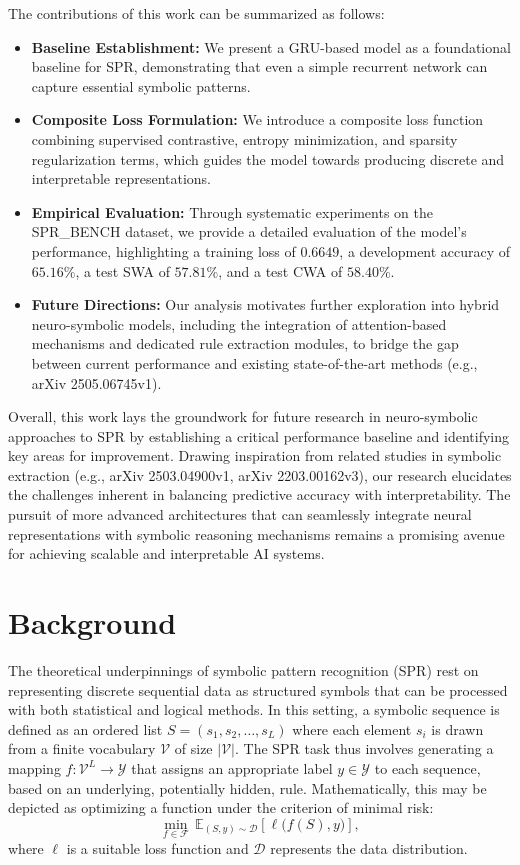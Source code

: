 \documentclass[12pt]{article}
\begin{document}
The contributions of this work can be summarized as follows:
\begin{itemize}
    \item \textbf{Baseline Establishment:} We present a GRU-based model as a foundational baseline for SPR, demonstrating that even a simple recurrent network can capture essential symbolic patterns.
    \item \textbf{Composite Loss Formulation:} We introduce a composite loss function combining supervised contrastive, entropy minimization, and sparsity regularization terms, which guides the model towards producing discrete and interpretable representations.
    \item \textbf{Empirical Evaluation:} Through systematic experiments on the SPR\_BENCH dataset, we provide a detailed evaluation of the model's performance, highlighting a training loss of \(0.6649\), a development accuracy of \(65.16\%\), a test SWA of \(57.81\%\),  and a test CWA of \(58.40\%\).
    \item \textbf{Future Directions:} Our analysis motivates further exploration into hybrid neuro-symbolic models, including the integration of attention-based mechanisms and dedicated rule extraction modules, to bridge the gap between current performance and existing state-of-the-art methods (e.g., arXiv 2505.06745v1).
\end{itemize}

Overall, this work lays the groundwork for future research in neuro-symbolic approaches to SPR by establishing a critical performance baseline and identifying key areas for improvement. Drawing inspiration from related studies in symbolic extraction (e.g., arXiv 2503.04900v1, arXiv 2203.00162v3), our research elucidates the challenges inherent in balancing predictive accuracy with interpretability. The pursuit of more advanced architectures that can seamlessly integrate neural representations with symbolic reasoning mechanisms remains a promising avenue for achieving scalable and interpretable AI systems.

\section{Background}
The theoretical underpinnings of symbolic pattern recognition (SPR) rest on representing discrete sequential data as structured symbols that can be processed with both statistical and logical methods. In this setting, a symbolic sequence is defined as an ordered list \( S = (s_1, s_2, \dots, s_L) \) where each element \( s_i \) is drawn from a finite vocabulary \( \mathcal{V} \) of size \( |\mathcal{V}| \). The SPR task thus involves generating a mapping \( f: \mathcal{V}^L \rightarrow \mathcal{Y} \) that assigns an appropriate label \( y \in \mathcal{Y} \) to each sequence, based on an underlying, potentially hidden, rule. Mathematically, this may be depicted as optimizing a function under the criterion of minimal risk:
\[
\min_{f \in \mathcal{F}} \, \mathbb{E}_{(S,y) \sim \mathcal{D}} \left[ \ell \big( f(S), y \big) \right],
\]
where \( \ell \) is a suitable loss function and \( \mathcal{D} \) represents the data distribution.
\end{document}

